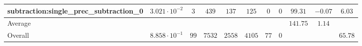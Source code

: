 \begin{tabular}{|l|c|c|c|c|c|c|c|c|c|c|}
subtraction:single\_prec\_subtraction\_0         & $ 3.021 \cdot 10^{-2} $ & $ 3      $ & $ 439  $ & $ 137  $ & $ 125   $ & $ 0  $ & $ 0 $ & $ 99.31       $ & $ -0.07   $ & $ 6.03    $ \\
\hline
Average                                          & $                     $ & $        $ & $      $ & $      $ & $       $ & $    $ & $   $ & $ 141.75      $ & $ 1.14    $ & $         $ \\
\hline
Overall                                          & $ 8.858 \cdot 10^{-1} $ & $ 99     $ & $ 7532 $ & $ 2558 $ & $ 4105  $ & $ 77 $ & $ 0 $ & $             $ & $         $ & $ 65.78   $ \\
\hline
\end{tabular}
